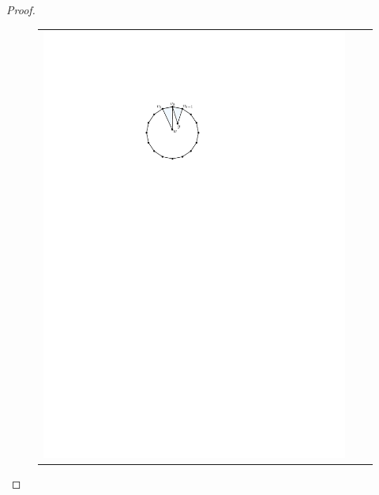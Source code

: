 \documentclass{article}
\theoremstyle{definition}
\begin{document}
\begin{proof}
\begin{figure}
\begin{tabular}{ccc}
      \includegraphics[page=2]{figs/really_good} &

\end{tabular}
\end{figure}
\end{proof}
\end{document}
